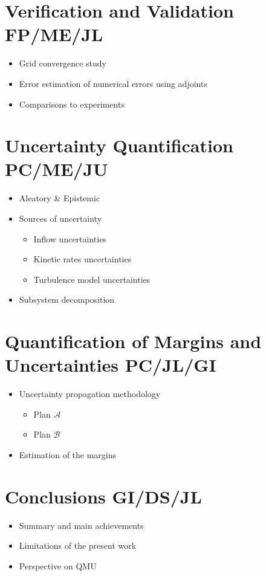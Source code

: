 \documentclass[11pt]{article}
\begin{document}
\section{Verification and Validation \color{red} FP/ME/JL}
\begin{itemize}
\item Grid convergence study
\item Error estimation of numerical errors using adjoints 
\item Comparisons to experiments
\end{itemize}

\section{Uncertainty Quantification \color{red} PC/ME/JU}
\begin{itemize}
\item Aleatory \& Epistemic
\item Sources of uncertainty
\begin{itemize}
\item Inflow uncertainties
\item Kinetic rates uncertainties
\item Turbulence model uncertainties
\end{itemize}
\item Subsystem decomposition
\end{itemize}

\section{Quantification of Margins and Uncertainties  \color{red} PC/JL/GI}
\begin{itemize}
\item Uncertainty propagation methodology
\begin{itemize}
\item Plan $\mathcal{A}$
\item Plan $\mathcal{B}$
\end{itemize}
\item Estimation of the margins 
\end{itemize}

\section{Conclusions  \color{red} GI/DS/JL}
\begin{itemize}
\item Summary and main achievements
\item Limitations of the present work
\item Perspective on QMU 
\end{itemize}
\end{document}
